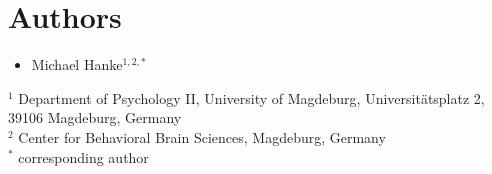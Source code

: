 \section*{Authors}

\begin{itemize}
\item Michael Hanke$^{1,2,*}$
\end{itemize}

$^{1}$ Department of Psychology II, University of Magdeburg, Universitätsplatz 2, 39106 Magdeburg, Germany\\
$^{2}$ Center for Behavioral Brain Sciences, Magdeburg, Germany\\
$^{*}$ corresponding author
